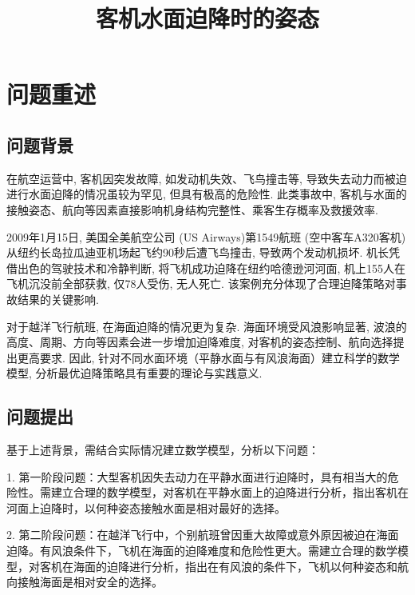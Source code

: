 \documentclass{cumcmthesis}
\title{客机水面迫降时的姿态}
\begin{document}
 \maketitle
 \begin{abstract}%

\end{abstract}



\section{问题重述}
\subsection{问题背景}
在航空运营中, 客机因突发故障, 如发动机失效、飞鸟撞击等, 导致失去动力而被迫进行水面迫降的情况虽较为罕见, 但具有极高的危险性. 此类事故中, 客机与水面的接触姿态、航向等因素直接影响机身结构完整性、乘客生存概率及救援效率. 

2009年1月15日, 美国全美航空公司 (US Airways)第1549航班 (空中客车A320客机)从纽约长岛拉瓜迪亚机场起飞约90秒后遭飞鸟撞击, 导致两个发动机损坏. 机长凭借出色的驾驶技术和冷静判断, 将飞机成功迫降在纽约哈德逊河河面, 机上155人在飞机沉没前全部获救, 仅78人受伤, 无人死亡. 该案例充分体现了合理迫降策略对事故结果的关键影响. 

对于越洋飞行航班, 在海面迫降的情况更为复杂. 海面环境受风浪影响显著, 波浪的高度、周期、方向等因素会进一步增加迫降难度, 对客机的姿态控制、航向选择提出更高要求. 因此, 针对不同水面环境（平静水面与有风浪海面）建立科学的数学模型, 分析最优迫降策略具有重要的理论与实践意义. 

\subsection{问题提出}
基于上述背景，需结合实际情况建立数学模型，分析以下问题：

1. 第一阶段问题：大型客机因失去动力在平静水面进行迫降时，具有相当大的危险性。需建立合理的数学模型，对客机在平静水面上的迫降进行分析，指出客机在河面上迫降时，以何种姿态接触水面是相对最好的选择。

2. 第二阶段问题：在越洋飞行中，个别航班曾因重大故障或意外原因被迫在海面迫降。有风浪条件下，飞机在海面的迫降难度和危险性更大。需建立合理的数学模型，对客机在海面的迫降进行分析，指出在有风浪的条件下，飞机以何种姿态和航向接触海面是相对安全的选择。
\end{document}
